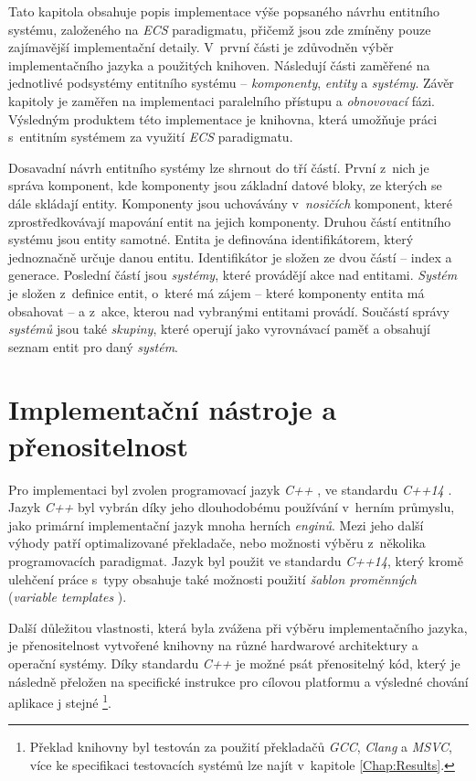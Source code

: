 Tato kapitola obsahuje popis implementace výše popsaného návrhu entitního systému, založeného na \emph{ECS} paradigmatu, přičemž jsou zde zmíněny pouze zajímavější implementační detaily. V~první části je zdůvodněn výběr implementačního jazyka a použitých knihoven. Následují části zaměřené na jednotlivé podsystémy entitního systému -- \emph{komponenty}, \emph{entity} a \emph{systémy}. Závěr kapitoly je zaměřen na implementaci paralelního přístupu a \emph{obnovovací} fázi. Výsledným produktem této implementace je knihovna, která umožňuje práci s~entitním systémem za využití \emph{ECS} paradigmatu. 

Dosavadní návrh entitního systémy lze shrnout do tří částí. První z~nich je správa komponent, kde komponenty jsou základní datové bloky, ze kterých se dále skládají entity. Komponenty jsou uchovávány v~\emph{nosičích} komponent, které zprostředkovávají mapování entit na jejich komponenty. Druhou částí entitního systému jsou entity samotné. Entita je definována identifikátorem, který jednoznačně určuje danou entitu. Identifikátor je složen ze dvou částí -- index a generace. Poslední částí jsou \emph{systémy}, které provádějí akce nad entitami. \emph{Systém} je složen z~definice entit, o~které má zájem -- které komponenty entita má obsahovat -- a z~akce, kterou nad vybranými entitami provádí. Součástí správy \emph{systémů} jsou také \emph{skupiny}, které operují jako vyrovnávací paměť a obsahují seznam entit pro daný \emph{systém}. 

\section{Implementační nástroje a přenositelnost}

Pro implementaci byl zvolen programovací jazyk \emph{C++} \cite{IsoCpp}, ve standardu \emph{C++14} \cite{Cpp14}. Jazyk \emph{C++} byl vybrán díky jeho dlouhodobému používání v~herním průmyslu, jako primární implementační jazyk mnoha herních \emph{enginů}. Mezi jeho další výhody patří optimalizované překladače, nebo možnosti výběru z~několika programovacích paradigmat. Jazyk byl použit ve standardu \emph{C++14}, který kromě ulehčení práce s~typy obsahuje také možnosti použití \emph{šablon proměnných} (\emph{variable templates} \cite{Cpp14VarTemplate}). 

Další důležitou vlastnosti, která byla zvážena při výběru implementačního jazyka, je přenositelnost vytvořené knihovny na různé hardwarové architektury a operační systémy. Díky standardu \emph{C++} je možné psát přenositelný kód, který je následně přeložen na specifické instrukce pro cílovou platformu a výsledné chování aplikace j stejné \footnote{Překlad knihovny byl testován za použití překladačů \emph{GCC}, \emph{Clang} a \emph{MSVC}, více ke specifikaci testovacích systémů lze najít v~kapitole \ref{Chap:Results}.}. 


